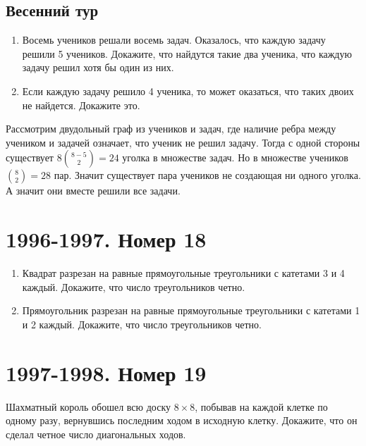 \documentclass[11pt, a4paper]{common/document_template}
\begin{document}
\section{Весенний тур}

\begin{exercise}
\begin{enumerate}
\item Восемь учеников решали восемь задач. Оказалось, что каждую задачу решили 5 учеников. Докажите, что найдутся такие два ученика, что каждую задачу решил хотя бы один из них.
\item Если каждую задачу решило 4 ученика, то может оказаться, что таких двоих не найдется. Докажите это.
\end{enumerate}
\end{exercise}

\begin{Solution}
Рассмотрим двудольный граф из учеников и задач, где наличие ребра между учеником и задачей означает, что ученик не решил задачу. Тогда с одной стороны существует $8 \binom{8 - 5}{2} = 24$ уголка в множестве задач. Но в множестве учеников $\binom{8}{2} = 28$ пар. Значит существует пара учеников не создающая ни одного уголка. А значит они вместе решили все задачи. 
\end{Solution}


\chapter{1996-1997. Номер 18}

\begin{exercise}
\begin{enumerate}
\item Квадрат разрезан на равные прямоугольные треугольники с катетами 3 и 4 каждый. Докажите, что число треугольников четно.
\item Прямоугольник разрезан на равные прямоугольные треугольники с катетами 1 и 2 каждый. Докажите, что число треугольников четно.
\end{enumerate}
\end{exercise}

\chapter{1997-1998. Номер 19}

\begin{exercise}
Шахматный король обошел всю доску $8 \times 8$, побывав на каждой клетке по одному разу, вернувшись последним ходом в исходную клетку. Докажите, что он сделал четное число диагональных ходов.
\end{exercise}
\end{document}
